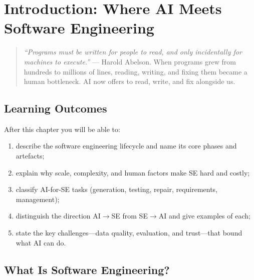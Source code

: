 \chapter{Introduction: Where AI Meets Software Engineering}
\label{ch:intro-ai4se}
\sloppy

\begin{quote}
\emph{``Programs must be written for people to read, and only incidentally for machines to execute.''} --- Harold Abelson. When programs grew from hundreds to millions of lines, reading, writing, and fixing them became a human bottleneck. AI now offers to read, write, and fix alongside us.
\end{quote}

\noindent{}
\vspace{0.4em}

\section*{Learning Outcomes}
After this chapter you will be able to:
\begin{enumerate}[label=(L\arabic*)]
    \item describe the software engineering lifecycle and name its core phases and artefacts;
    \item explain why scale, complexity, and human factors make SE hard and costly;
    \item classify AI-for-SE tasks (generation, testing, repair, requirements, management);
    \item distinguish the direction AI$\to$SE from SE$\to$AI and give examples of each;
    \item state the key challenges---data quality, evaluation, and trust---that bound what AI can do.
\end{enumerate}

\section{What Is Software Engineering?}
\label{sec:what-is-se}
